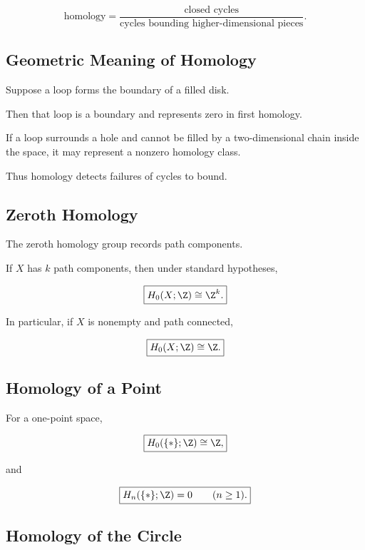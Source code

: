 \[
\boxed{
\text{homology}
=
\frac{
\text{closed cycles}
}{
\text{cycles bounding higher-dimensional pieces}
}.
}
\]

\subsection{Geometric Meaning of Homology}
\label{subsec:geometric-meaning-homology}

Suppose a loop forms the boundary of a filled disk.

Then that loop is a boundary and represents zero in first homology.

If a loop surrounds a hole and cannot be filled by a two-dimensional chain
inside the space, it may represent a nonzero homology class.

Thus homology detects failures of cycles to bound.

\subsection{Zeroth Homology}
\label{subsec:zeroth-homology}

The zeroth homology group records path components.

If \(X\) has \(k\) path components, then under standard hypotheses,

\[
\boxed{
H_0(X;\Z)
\cong
\Z^k.
}
\]

In particular, if \(X\) is nonempty and path connected,

\[
\boxed{
H_0(X;\Z)\cong\Z.
}
\]

\subsection{Homology of a Point}
\label{subsec:homology-point}

For a one-point space,

\[
\boxed{
H_0(\{*\};\Z)\cong\Z,
}
\]

and

\[
\boxed{
H_n(\{*\};\Z)=0
\qquad
(n\geq1).
}
\]

\subsection{Homology of the Circle}
\label{subsec:homology-circle}

